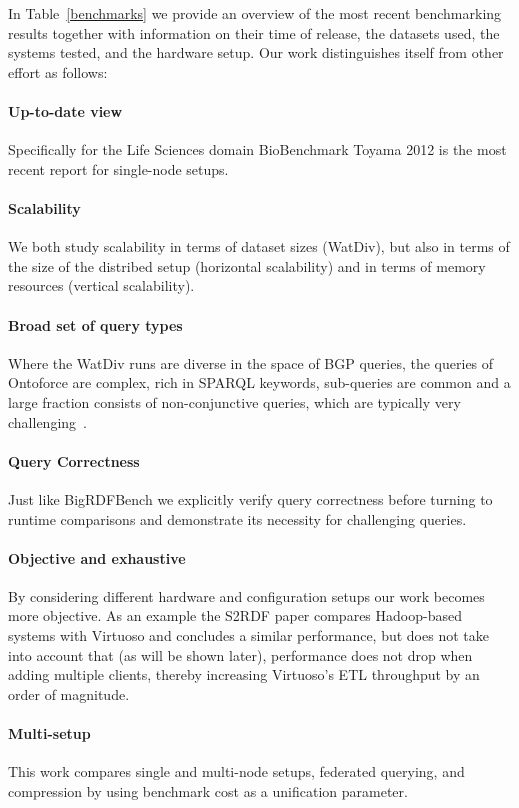 In Table~\ref{benchmarks} we provide an overview of the most recent benchmarking results together with information on their time of release, the datasets used,
the systems tested, and the hardware setup. Our work distinguishes itself from other effort as follows:

\paragraph{Up-to-date view} Specifically for the Life Sciences domain BioBenchmark Toyama 2012 is the most recent report for single-node setups.
\paragraph{Scalability} We both study scalability in terms of dataset sizes (WatDiv), but also in terms of the size of the distribed setup (horizontal scalability) and in terms of memory resources (vertical scalability).

\paragraph{Broad set of query types} Where the WatDiv runs are diverse in the space of BGP queries, the queries of Ontoforce are complex, rich in SPARQL keywords, sub-queries are common and a large fraction consists of non-conjunctive queries, which are typically very challenging~\cite{Picalausa2011}. 

\paragraph{Query Correctness} Just like BigRDFBench we explicitly verify query correctness before turning to runtime comparisons and demonstrate its necessity for challenging queries.

\paragraph{Objective and exhaustive} By considering different hardware and configuration setups our work becomes more objective. As an example the S2RDF paper compares Hadoop-based systems with Virtuoso and concludes a similar performance, but does not take into account that (as will be shown later), performance does not drop when adding multiple clients, thereby increasing Virtuoso's ETL throughput by an order of magnitude.

\paragraph{Multi-setup} This work compares single and multi-node setups, federated querying, and compression by using benchmark cost as a unification parameter.

